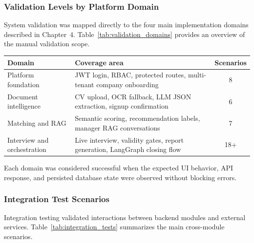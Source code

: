 \subsubsection{Validation Levels by Platform Domain}
\label{sec:ch5:validation_levels}

System validation was mapped directly to the four main implementation domains described in Chapter~4. Table~\ref{tab:validation_domains} provides an overview of the manual validation scope.

\begin{center}
\label{tab:validation_domains}
\renewcommand{\arraystretch}{1.15}
\begin{tabularx}{\textwidth}{|l|X|c|}
\hline
\rowcolor{gray!20} \textbf{Domain} & \textbf{Coverage area} & \textbf{Scenarios} \\
\hline
Platform foundation &
JWT login, RBAC, protected routes, multi-tenant company onboarding &
8 \\
\hline
Document intelligence &
CV upload, OCR fallback, LLM JSON extraction, signup confirmation &
6 \\
\hline
Matching and RAG &
Semantic scoring, recommendation labels, manager RAG conversations &
7 \\
\hline
Interview and orchestration &
Live interview, validity gates, report generation, LangGraph closing flow &
18+ \\
\hline
\end{tabularx}
\end{center}

Each domain was considered successful when the expected UI behavior, API response, and persisted database state were observed without blocking errors.

\subsubsection{Integration Test Scenarios}
\label{sec:ch5:integration_tests}

Integration testing validated interactions between backend modules and external services. Table~\ref{tab:integration_tests} summarizes the main cross-module scenarios.

